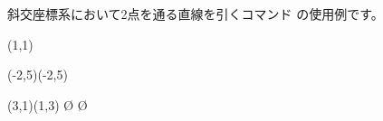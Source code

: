 \documentclass{jarticle}
\begin{document}
斜交座標系において2点を通る直線を引くコマンド
の使用例です。

\begin{showEx}(1,1){}
\begin{zahyou}[ul=10mm](-2,5)(-2,5)
  \zahyouMemori[g]
  \begin{azahyou}{(3,1)}{(1,3)}
    \azPut{}\azPut{}
    \azKuromaru{\E}\azKuromaru{\F}
    \azTyokusen\O\F{}{}
    \azTyokusen\O\E{}{}
    \azTyokusen\E\F{}{}
  \end{azahyou}
\end{zahyou}
\end{showEx}
\end{document}
